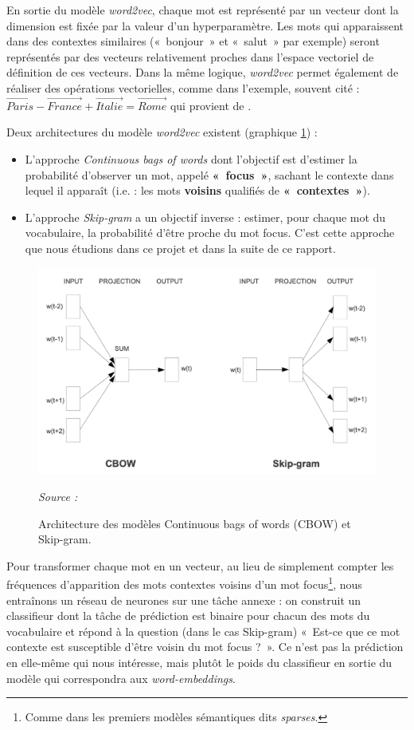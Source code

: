\documentclass[11pt,french,french]{article}
\let\rmarkdownfootnote\footnote%
\def\footnote{\protect\rmarkdownfootnote}
\begin{document}
En sortie du modèle \emph{word2vec}, chaque mot est représenté par un
vecteur dont la dimension est fixée par la valeur d'un hyperparamètre.
Les mots qui apparaissent dans des contextes similaires («~bonjour~» et
«~salut~» par exemple) seront représentés par des vecteurs relativement
proches dans l'espace vectoriel de définition de ces vecteurs. Dans la
même logique, \emph{word2vec} permet également de réaliser des
opérations vectorielles, comme dans l'exemple, souvent cité :
\(\overrightarrow{Paris} - \overrightarrow{France} + \overrightarrow{Italie} = \overrightarrow{Rome}\)
qui provient de \cite{Mikolov}.

Deux architectures du modèle \emph{word2vec} existent (graphique
\ref{fig:cbowskipgram}) :

\begin{itemize}
\item
  L'approche \emph{Continuous bags of words} dont l'objectif est
  d'estimer la probabilité d'observer un mot, appelé \textbf{«~focus~»},
  sachant le contexte dans lequel il apparaît (i.e. : les mots
  \textbf{voisins} qualifiés de \textbf{«~contextes~»}).
\item
  L'approche \emph{Skip-gram} a un objectif inverse : estimer, pour
  chaque mot du vocabulaire, la probabilité d'être proche du mot focus.
  C'est cette approche que nous étudions dans ce projet et dans la suite
  de ce rapport. 
\end{itemize}

\begin{figure}[htp]
\centering
\includegraphics[width=.6\textwidth]{img/cbow_skip_gram.png}
\captionsetup{margin=0cm,format=hang,justification=justified}
\caption{Architecture des modèles Continuous bags of words (CBOW) et Skip-gram.}\label{fig:cbowskipgram}
\footnotesize
\emph{Source : \cite{Mikolov}}
\end{figure}

Pour transformer chaque mot en un vecteur, au lieu de simplement compter
les fréquences d'apparition des mots contextes voisins d'un mot
focus\footnote{Comme dans les premiers modèles sémantiques dits
  \emph{sparses}.}, nous entraînons un réseau de neurones sur une tâche
annexe : on construit un classifieur dont la tâche de prédiction est
binaire pour chacun des mots du vocabulaire et répond à la question
(dans le cas Skip-gram) «~Est-ce que ce mot contexte est susceptible
d'être voisin du mot focus ?~». Ce n'est pas la prédiction en elle-même
qui nous intéresse, mais plutôt le poids du classifieur en sortie du
modèle qui correspondra aux \emph{word-embeddings}.
\end{document}
